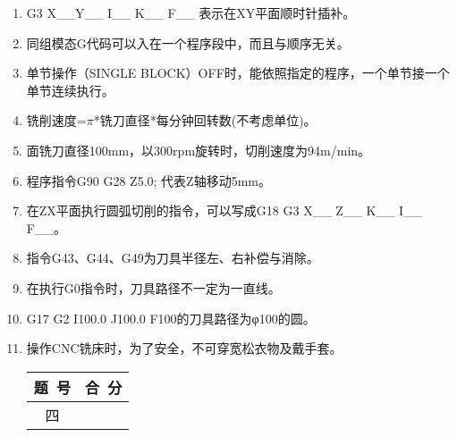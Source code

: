 \documentclass[12pt,twocolumn,landscape,UTF8,twoside]{ctexart}
\begin{document}
\begin{spacing}{1.3}
\begin{enumerate} [1、]
\item G3 X\_\_Y\_\_ I\_\_ K\_\_ F\_\_ 表示在XY平面顺时针插补。
\item 同组模态G代码可以入在一个程序段中，而且与顺序无关。
\item 单节操作（SINGLE BLOCK）OFF时，能依照指定的程序，一个单节接一个单节连续执行。
\item 铣削速度=$\pi$*铣刀直径*每分钟回转数(不考虑单位)。
\item 面铣刀直径100mm，以300rpm旋转时，切削速度为94m/min。
\item 程序指令G90 G28 Z5.0; 代表Z轴移动5mm。
\item 在ZX平面执行圆弧切削的指令，可以写成G18 G3 X\_\_ Z\_\_ K\_\_ I\_\_ F\_\_。
\item 指令G43、G44、G49为刀具半径左、右补偿与消除。
\item 在执行G0指令时，刀具路径不一定为一直线。
\item G17 G2 I100.0 J100.0 F100的刀具路径为φ100的圆。
\item 操作CNC铣床时，为了安全，不可穿宽松衣物及戴手套。

\vspace{1cm}
	
\item[\heiti
\begin{minipage}{\@}	\begin{tabular}{|c|c|}\hline
		题~号 & 合~分\\ \hline		四&       \\\hline	\end{tabular}\end{minipage} ]


\end{enumerate}
\end{spacing}
\end{document}
